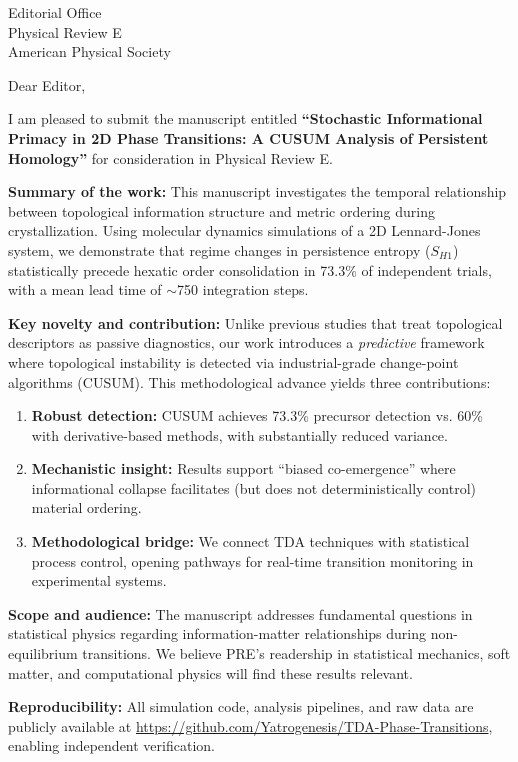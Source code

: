 \documentclass[11pt]{letter}
\begin{document}
\begin{letter}{Editorial Office\\Physical Review E\\American Physical Society}

\opening{Dear Editor,}

I am pleased to submit the manuscript entitled \textbf{``Stochastic Informational Primacy in 2D Phase Transitions: A CUSUM Analysis of Persistent Homology''} for consideration in Physical Review E.

\textbf{Summary of the work:} This manuscript investigates the temporal relationship between topological information structure and metric ordering during crystallization. Using molecular dynamics simulations of a 2D Lennard-Jones system, we demonstrate that regime changes in persistence entropy ($S_{H1}$) statistically precede hexatic order consolidation in 73.3\% of independent trials, with a mean lead time of $\sim$750 integration steps.

\textbf{Key novelty and contribution:} Unlike previous studies that treat topological descriptors as passive diagnostics, our work introduces a \textit{predictive} framework where topological instability is detected via industrial-grade change-point algorithms (CUSUM). This methodological advance yields three contributions:

\begin{enumerate}
    \item \textbf{Robust detection:} CUSUM achieves 73.3\% precursor detection vs. 60\% with derivative-based methods, with substantially reduced variance.
    \item \textbf{Mechanistic insight:} Results support ``biased co-emergence'' where informational collapse facilitates (but does not deterministically control) material ordering.
    \item \textbf{Methodological bridge:} We connect TDA techniques with statistical process control, opening pathways for real-time transition monitoring in experimental systems.
\end{enumerate}

\textbf{Scope and audience:} The manuscript addresses fundamental questions in statistical physics regarding information-matter relationships during non-equilibrium transitions. We believe PRE's readership in statistical mechanics, soft matter, and computational physics will find these results relevant.

\textbf{Reproducibility:} All simulation code, analysis pipelines, and raw data are publicly available at \url{https://github.com/Yatrogenesis/TDA-Phase-Transitions}, enabling independent verification.


\end{letter}
\end{document}
